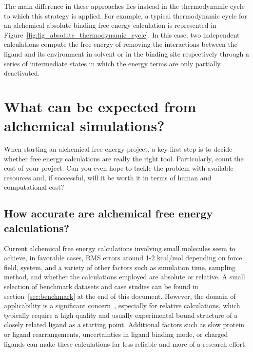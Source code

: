 \documentclass[9pt,bestpractices]{livecoms}
\begin{document}
The main difference in these approaches lies instead in the thermodynamic cycle to which this strategy is applied.
For example, a typical thermodynamic cycle for an alchemical absolute binding free energy calculation is represented in Figure~\ref{fig:fig_absolute_thermodynamic_cycle}.
In this case, two independent calculations compute the free energy of removing the interactions between the ligand and its environment in solvent or in the binding site respectively through a series of intermediate states in which the energy terms are only partially deactivated.




\section{What can be expected from alchemical simulations?}
\label{sec:step0}
When starting an alchemical free energy project, a key first step is to decide whether free energy calculations are really the right tool. Particularly, count the cost of your
project: Can you even hope to tackle the problem with available resources and, if successful, will it
be worth it in terms of human and computational cost?
\subsection{How accurate are alchemical free energy calculations?}
\label{subsec:expectation}
%
Current alchemical free energy calculations involving small molecules seem to achieve, in favorable cases, RMS errors around 1-2 kcal/mol depending on force field, system, and a variety of other factors such as simulation time, sampling method, and whether the calculations employed are absolute or relative. A small selection of benchmark datasets and case studies can be found in section~\ref{sec:benchmark} at the end of this document.
However, the domain of applicability is a significant concern~\cite{sherborne2016collaborating, cournia2017relative}, especially for relative calculations, which typically require a high quality and usually experimental bound structure of a closely
related ligand as a starting point. Additional factors such as slow protein or ligand rearrangements, uncertainties in ligand binding mode, or charged ligands can make these calculations far less reliable and more of a research effort.
%
\end{document}
